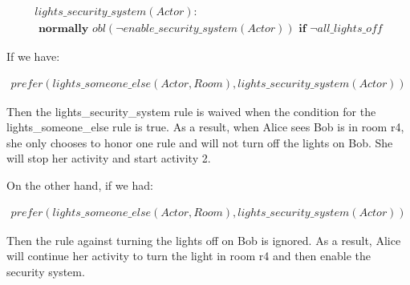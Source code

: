 \begin{equation}
\begin{split}
lights\_security\_system(Actor): \\
\textbf{ normally } obl(\neg enable\_security\_system(Actor)) \textbf{ if }
    \neg all\_lights\_off
\end{split}
\end{equation}

If we have:

\begin{equation}
\begin{split}
prefer(lights\_someone\_else(Actor, Room), lights\_security\_system(Actor))
\end{split}
\end{equation}

Then the lights\_security\_system rule is waived when the condition for the lights\_someone\_else rule is true.
As a result, when Alice sees Bob is in room r4, she only chooses to honor one rule and will not turn off the lights on Bob.
She will stop her activity and start activity 2.

On the other hand, if we had:

\begin{equation}
\begin{split}
prefer(lights\_someone\_else(Actor, Room), lights\_security\_system(Actor))
\end{split}
\end{equation}

Then the rule against turning the lights off on Bob is ignored.
As a result, Alice will continue her activity to turn the light in room r4 and then enable the security system.

%
